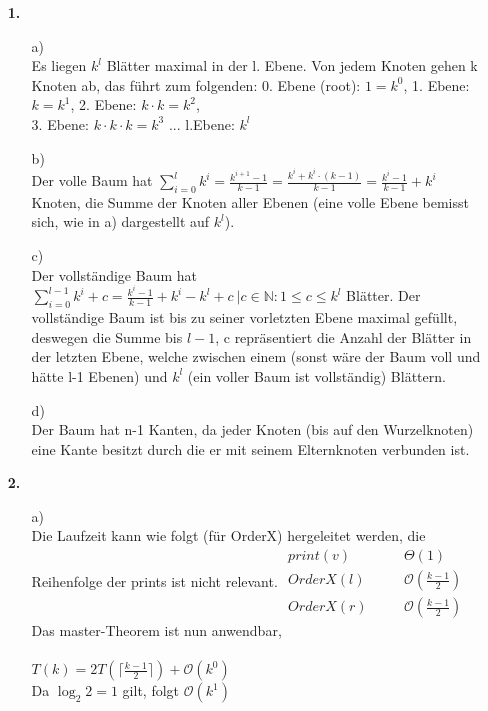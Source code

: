 \documentclass[a4paper,11pt,fleqn]{scrartcl}
\title{\titleinfo}
\author{\authorinfo}
\begin{document}
	\maketitle
	\begin{enumerate}
		\item[\textbf{1.}]
		\begin{enumerate}
			\item[a)]\quad \\
				Es liegen \(k^l\) Blätter maximal in der l. Ebene. Von jedem Knoten gehen k Knoten ab, das führt zum 
				folgenden: 0. Ebene (root): \(1 = k^0\), 1. Ebene: \(k = k^1\), 2. Ebene: \(k\cdot k = k^2\),\\
				3. Ebene: \(k\cdot k \cdot k = k^3\) ... l.Ebene: \(k^l\)
			\item[b)]\quad \\
				Der volle Baum hat \(\sum\limits_{i=0}^l k^i = \frac{k^{i+1}-1}{k-1}=\frac{k^i+k^i\cdot(k-1)}{k-1}=
				\frac{k^i-1}{k-1}+k^i\) Knoten, die Summe der Knoten aller Ebenen (eine volle Ebene bemisst sich, wie in a)
				dargestellt auf \(k^l\)).
			\item[c)]\quad \\
				Der vollständige Baum hat \(\sum\limits_{i=0}^{l-1}k^i +c = \frac{k^i-1}{k-1}+k^i-k^l+c\ |c\in\mathbb{N}:1\leq c\leq k^l\)				
				Blätter. Der vollständige Baum ist bis zu seiner vorletzten Ebene maximal gefüllt, deswegen die 
				Summe bis $l-1$, c repräsentiert die Anzahl der Blätter in der letzten Ebene, welche zwischen 
				einem (sonst wäre der Baum voll und hätte l-1 Ebenen) und $k^l$ (ein voller Baum ist 
				vollständig) Blättern.
			\item[d)]\quad \\
				Der Baum hat n-1 Kanten, da jeder Knoten (bis auf den Wurzelknoten) eine Kante besitzt durch 
				die er mit seinem Elternknoten verbunden ist.
		\end{enumerate}
		
		\item[\textbf{2.}]
		\begin{enumerate}
			\item[a)]\quad \\
				Die Laufzeit kann wie folgt (für OrderX) hergeleitet werden, die Reihenfolge der prints ist nicht relevant. 
				\(
				\begin{array}{lll}
					print(v) &\quad & \Theta(1) \\
					OrderX(l) &\quad & \mathcal{O}(\frac{k-1}{2}) \\
					OrderX(r) &\quad & \mathcal{O}(\frac{k-1}{2})
				\end{array}
				\) \\
				Das master-Theorem ist nun anwendbar, \\ \\
				\(T(k)=2T(\big\lceil\frac{ k-1}{2}\big\rceil)+\mathcal{O}(k^0)\) \\
				Da \(\log_2 2 = 1\) gilt, folgt \(\mathcal{O}(k^1)\) 
				

\end{enumerate}
\end{enumerate}
\end{document}
